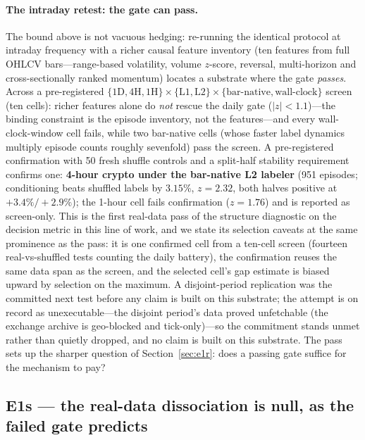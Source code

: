 \documentclass{article}
\begin{document}
\paragraph{The intraday retest: the gate can pass.} The bound above is
not vacuous hedging: re-running the identical protocol at intraday
frequency with a richer causal feature inventory (ten features from full
OHLCV bars---range-based volatility, volume $z$-score, reversal,
multi-horizon and cross-sectionally ranked momentum) locates a substrate
where the gate \emph{passes}. Across a pre-registered
$\{1\mathrm{D}, 4\mathrm{H}, 1\mathrm{H}\} \times \{\mathrm{L1},
\mathrm{L2}\} \times \{\text{bar-native}, \text{wall-clock}\}$ screen
(ten cells): richer features alone do \emph{not} rescue the daily gate
($|z| < 1.1$)---the binding constraint is the episode inventory, not the
features---and every wall-clock-window cell fails, while two bar-native
cells (whose faster label dynamics multiply episode counts roughly
sevenfold) pass the screen. A pre-registered confirmation with 50 fresh
shuffle controls and a split-half stability requirement confirms one:
\textbf{4-hour crypto under the bar-native L2 labeler} (951 episodes;
conditioning beats shuffled labels by $3.15\%$, $z = 2.32$, both halves
positive at $+3.4\%/+2.9\%$); the 1-hour cell fails confirmation
($z = 1.76$) and is reported as screen-only. This is the first real-data
pass of the structure diagnostic on the decision metric in this line of
work, and we state its selection caveats at the same prominence as the
pass: it is one confirmed cell from a ten-cell screen (fourteen
real-vs-shuffled tests counting the daily battery), the confirmation
reuses the same data span as the screen, and the selected cell's gap
estimate is biased upward by selection on the maximum. A
disjoint-period replication was the committed next test before any
claim is built on this substrate; the attempt is on record as
unexecutable---the disjoint period's data proved unfetchable (the
exchange archive is geo-blocked and tick-only)---so the commitment
stands unmet rather than quietly dropped, and no claim is built on
this substrate. The pass sets up the sharper question
of Section~\ref{sec:e1r}: does a passing gate suffice for the mechanism
to pay?

\subsection{E1s --- the real-data dissociation is null, as the failed gate
predicts}
\label{sec:e1s}
\end{document}
